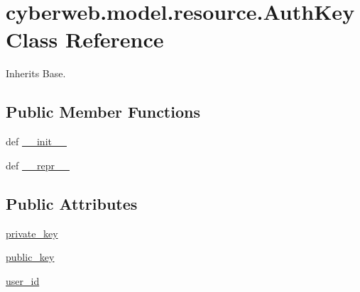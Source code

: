 \hypertarget{classcyberweb_1_1model_1_1resource_1_1_auth_key}{\section{cyberweb.\-model.\-resource.\-Auth\-Key \-Class \-Reference}
\label{classcyberweb_1_1model_1_1resource_1_1_auth_key}
}


\-Inherits \-Base.

\subsection*{\-Public \-Member \-Functions}
\begin{DoxyCompactItemize}
\item 
def \hyperlink{classcyberweb_1_1model_1_1resource_1_1_auth_key_aec5e4370fc9bc64ed980581db28d2f0b}{\-\_\-\-\_\-init\-\_\-\-\_\-}
\item 
def \hyperlink{classcyberweb_1_1model_1_1resource_1_1_auth_key_a6928fc5e8f8b518f9bd88fb4cb805ddc}{\-\_\-\-\_\-repr\-\_\-\-\_\-}
\end{DoxyCompactItemize}
\subsection*{\-Public \-Attributes}
\begin{DoxyCompactItemize}
\item 
\hyperlink{classcyberweb_1_1model_1_1resource_1_1_auth_key_adb5a4b483fa44389c1fe9d5828815a3a}{private\-\_\-key}
\item 
\hyperlink{classcyberweb_1_1model_1_1resource_1_1_auth_key_a073b8f6b5a76026f841cdf898a418e76}{public\-\_\-key}
\item 
\hyperlink{classcyberweb_1_1model_1_1resource_1_1_auth_key_a22d5c7c5fa7d683ebd15e193e5be1ec4}{user\-\_\-id}
\end{DoxyCompactItemize}
